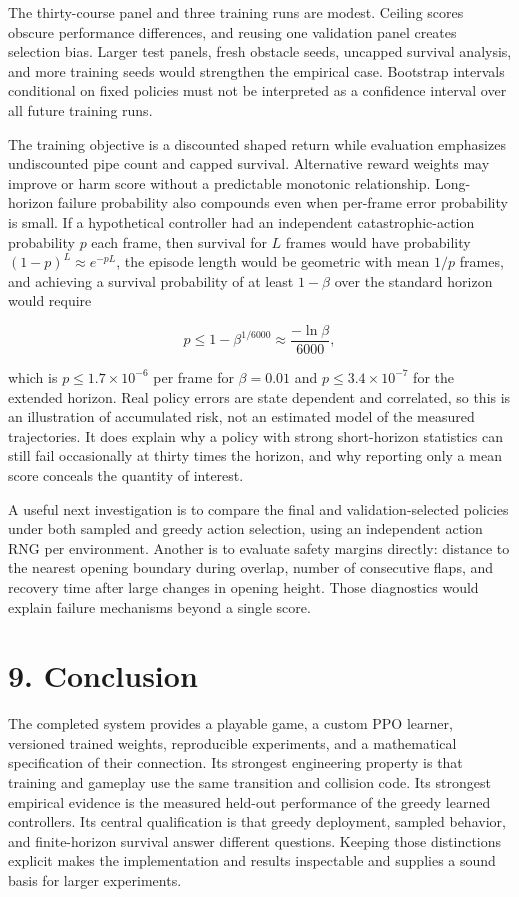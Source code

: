 \documentclass[
  11pt,
]{article}
\begin{document}
The thirty-course panel and three training runs are modest. Ceiling
scores obscure performance differences, and reusing one validation panel
creates selection bias. Larger test panels, fresh obstacle seeds,
uncapped survival analysis, and more training seeds would strengthen the
empirical case. Bootstrap intervals conditional on fixed policies must
not be interpreted as a confidence interval over all future training
runs.

The training objective is a discounted shaped return while evaluation
emphasizes undiscounted pipe count and capped survival. Alternative
reward weights may improve or harm score without a predictable monotonic
relationship. Long-horizon failure probability also compounds even when
per-frame error probability is small. If a hypothetical controller had
an independent catastrophic-action probability \(p\) each frame, then
survival for \(L\) frames would have probability
\((1-p)^L\approx e^{-pL}\), the episode length would be geometric with
mean \(1/p\) frames, and achieving a survival probability of at least
\(1-\beta\) over the standard horizon would require

\[
p\le1-\beta^{1/6000}\approx\frac{-\ln\beta}{6000},
\]

which is \(p\le1.7\times10^{-6}\) per frame for \(\beta=0.01\) and
\(p\le3.4\times10^{-7}\) for the extended horizon. Real policy errors
are state dependent and correlated, so this is an illustration of
accumulated risk, not an estimated model of the measured trajectories.
It does explain why a policy with strong short-horizon statistics can
still fail occasionally at thirty times the horizon, and why reporting
only a mean score conceals the quantity of interest.

A useful next investigation is to compare the final and
validation-selected policies under both sampled and greedy action
selection, using an independent action RNG per environment. Another is
to evaluate safety margins directly: distance to the nearest opening
boundary during overlap, number of consecutive flaps, and recovery time
after large changes in opening height. Those diagnostics would explain
failure mechanisms beyond a single score.

\section{9. Conclusion}\label{conclusion}

The completed system provides a playable game, a custom PPO learner,
versioned trained weights, reproducible experiments, and a mathematical
specification of their connection. Its strongest engineering property is
that training and gameplay use the same transition and collision code.
Its strongest empirical evidence is the measured held-out performance of
the greedy learned controllers. Its central qualification is that greedy
deployment, sampled behavior, and finite-horizon survival answer
different questions. Keeping those distinctions explicit makes the
implementation and results inspectable and supplies a sound basis for
larger experiments.
\end{document}

